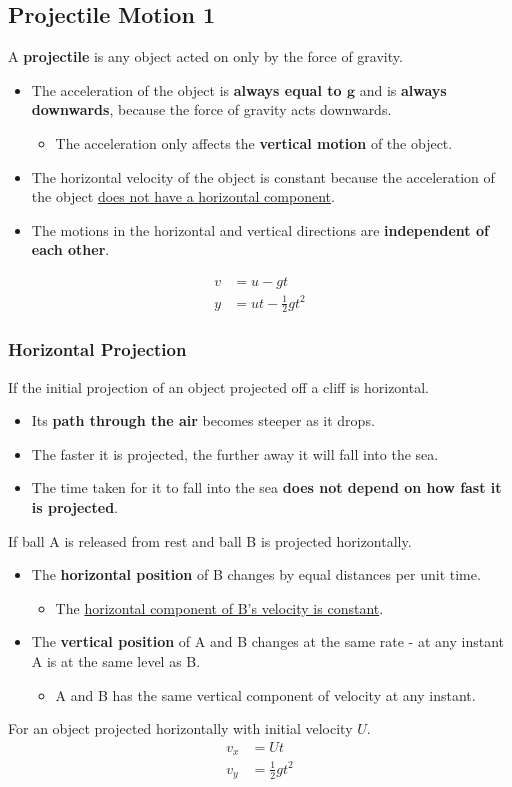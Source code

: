 \subsection{Projectile Motion 1}

A \textbf{projectile} is any object acted on only by the force of gravity.
\begin{itemize}
    \item The acceleration of the object is \textbf{always equal to $\mathbf{g}$} and is \textbf{always downwards}, because the force of gravity acts downwards.
        \begin{itemize}
            \item The acceleration only affects the \textbf{vertical motion} of the object.
        \end{itemize}
    \item The horizontal velocity of the object is constant because the acceleration of the object \underline{does not have a horizontal component}.
    \item The motions in the horizontal and vertical directions are \textbf{independent of each other}.
\end{itemize}
\begin{align*}
    v&=u-gt\\
    y&=ut-\frac{1}{2}gt^2
\end{align*}

\subsubsection*{Horizontal Projection}

If the initial projection of an object projected off a cliff is horizontal.
\begin{itemize}
    \item Its \textbf{path through the air} becomes steeper as it drops.
    \item The faster it is projected, the further away it will fall into the sea.
    \item The time taken for it to fall into the sea \textbf{does not depend on how fast it is projected}.
\end{itemize}

If ball A is released from rest and ball B is projected horizontally.
\begin{itemize}
    \item The \textbf{horizontal position} of B changes by equal distances per unit time.
        \begin{itemize}
            \item The \underline{horizontal component of B's velocity is constant}.
        \end{itemize}
    \item The \textbf{vertical position} of A and B changes at the same rate - at any instant A is at the same level as B.
        \begin{itemize}
            \item A and B has the same vertical component of velocity at any instant.
        \end{itemize}
\end{itemize}

For an object projected horizontally with initial velocity $U$.
\begin{align*}
    v_x&=Ut\\
    v_y&=\frac{1}{2}gt^2
\end{align*}
